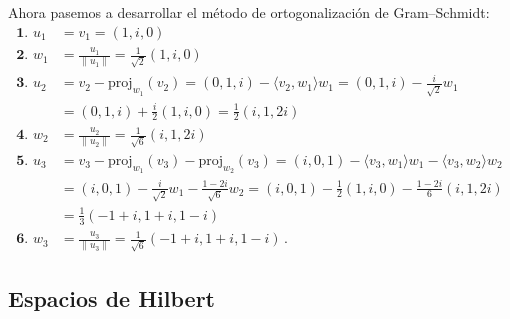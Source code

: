 \begin{eje}[Ortogonalización en $\C^3$]
  Ahora pasemos a desarrollar el método de ortogonalización de Gram--Schmidt:
  \begin{align*}
    \textbf{1. } u_1 & = v_1 = (1, i, 0)                                                                                                                                                                               \\
    \textbf{2. } w_1 & =  \frac{u_1}{\|u_1\|} = \frac{1}{\sqrt{2}} (1, i, 0)                                                                                                                                           \\
    \textbf{3. } u_2 & = v_2 - \text{proj}_{w_1}(v_2) = (0, 1, i) - \langle v_2, w_1 \rangle w_1 = (0, 1, i) - \frac{i}{\sqrt{2}}w_1                                                                                   \\
                     & = (0, 1, i) + \frac{i}{2}(1, i, 0) = \frac{1}{2}(i, 1, 2i)                                                                                                                                      \\
    \textbf{4. } w_2 & = \frac{u_2}{\|u_2\|}=\frac{1}{\sqrt{6}} (i, 1, 2i)                                                                                                                                             \\
    \textbf{5. } u_3 & = v_3 - \text{proj}_{w_1}(v_3) - \text{proj}_{w_2}(v_3) = (i, 0, 1) - \langle v_3, w_1 \rangle w_1 - \langle v_3, w_2 \rangle w_2                                                               \\
                     & = (i, 0, 1) - \frac{i}{\sqrt{2}}w_1 - \frac{1-2i}{\sqrt{6}}w_2                                                                  = (i, 0, 1) - \frac{1}{2} (1, i, 0) - \frac{1-2i}{6} (i, 1, 2i) \\
                     & = \frac{1}{3}(-1+i, 1+i, 1-i)                                                                                                                                                                   \\
    \textbf{6. } w_3 & = \frac{u_3}{\|u_3\|}=\frac{1}{\sqrt{6}}(-1+i, 1+i, 1-i)\,.
  \end{align*}
\end{eje}

\subsection{Espacios de Hilbert}


